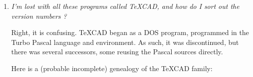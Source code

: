 \documentclass[11pt,a4paper]{article}
\begin{document}
\begin{enumerate}
\begin{enumerate}
\end{enumerate}
%
As a conclusion for this question, please don't remove the \TeX\, comments
inside the {\TC} picture text, unless you intend not to rework your
picture again anymore. Even then, you will be able to do it but won't see
everything on screen, or lose some structures or groupings. Note that you can
remove harmlessly the comments before ``\verb#\begin{picture}#''
since they only contain the switches for the {\TC} picture options.
%
\item
{\em I'm lost with all these programs called TeXCAD, and how do I sort out the version numbers ?}

Right, it is confusing.
TeXCAD began as a DOS program, programmed in the Turbo Pascal language and environment.
As such, it was discontinued, but there was several successors, some reusing
the Pascal sources directly.

Here is a (probable incomplete) genealogy of the TeXCAD family:


\end{enumerate}
\end{document}

